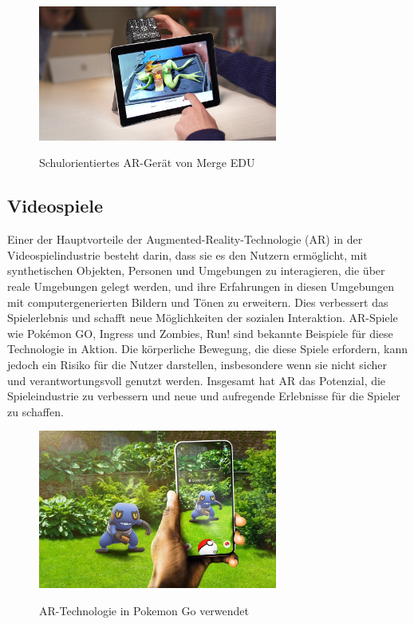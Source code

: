 \vspace{1cm}

\begin{figure}[h!]
    \centering
    \includegraphics[width=0.7\textwidth]{attachments/cube.jpeg}
    \caption{Schulorientiertes AR-Gerät von Merge EDU} \cite{Merge_EDU}
\end{figure}

\subsection{Videospiele}

Einer der Hauptvorteile der Augmented-Reality-Technologie (AR) in der Videospielindustrie besteht darin, dass sie es den Nutzern ermöglicht, mit synthetischen Objekten, Personen und Umgebungen zu interagieren, die über reale Umgebungen gelegt werden, und ihre Erfahrungen in diesen Umgebungen mit computergenerierten Bildern und Tönen zu erweitern. Dies verbessert das Spielerlebnis und schafft neue Möglichkeiten der sozialen Interaktion. AR-Spiele wie Pokémon GO, Ingress und Zombies, Run! sind bekannte Beispiele für diese Technologie in Aktion. Die körperliche Bewegung, die diese Spiele erfordern, kann jedoch ein Risiko für die Nutzer darstellen, insbesondere wenn sie nicht sicher und verantwortungsvoll genutzt werden. Insgesamt hat AR das Potenzial, die Spieleindustrie zu verbessern und neue und aufregende Erlebnisse für die Spieler zu schaffen. \cite{Das2017AugmentedRV}

\vspace{1cm}

\begin{figure}[ht!]
    \centering
    \includegraphics[width=0.7\textwidth]{attachments/pokemon.jpg}
    \caption{AR-Technologie in Pokemon Go verwendet} \cite{Pokemon_GO}
\end{figure}


